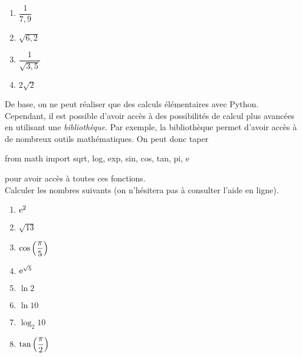 \begin{multicols}{2}
  \begin{enumerate}[label=\emph{\alph*)}]
    \item $\dfrac{1}{7,9}$
    \item $\sqrt{6,2}$
    \item $\dfrac{1}{\sqrt{3,5}}$
    \item $2\sqrt{2}$
  \end{enumerate}
\end{multicols}
De base, on ne peut réaliser que des calculs élémentaires avec Python. Cependant, il est possible d'avoir accès à des possibilités de calcul plus avancées en utilisant une \emph{bibliothèque}. 
Par exemple, la bibliothèque  permet d'avoir accès à de nombreux outils mathématiques. 
On peut donc taper
\begin{pyverbatim}
  from math import sqrt, log, exp, sin, cos, tan, pi, e 
\end{pyverbatim}
pour avoir accès à toutes ces fonctions. \\
Calculer les nombres suivants (on n'hésitera pas à consulter l'aide en ligne).
\begin{multicols}{2}
  \begin{enumerate}[label=\emph{\alph*)}]
    \item $\mathrm{e}^2$
    \item $\sqrt{13}$
    \item $\cos\left( \dfrac{\pi}{5}\right)$
    \item $\mathrm{e}^{\sqrt{5}}$
    \item $\ln 2$
    \item $\ln 10$
    \item $\log_{2} 10$
    \item $\tan\left( \dfrac{\pi}{2}\right)$
  \end{enumerate}
\end{multicols}